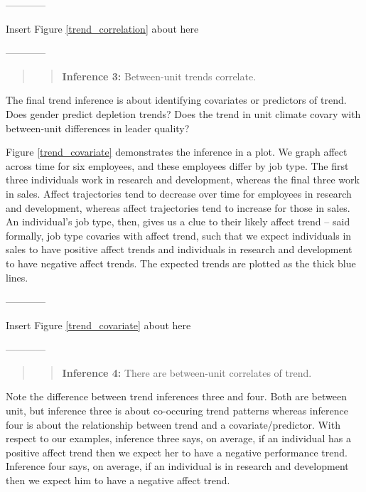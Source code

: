 \documentclass[english,,man]{apa6}
\begin{document}
\begin{center}

------------

Insert Figure \ref{trend_correlation} about here

------------

\end{center}

\begin{quote}
\begin{quote}
\textbf{Inference 3:} Between-unit trends correlate.
\end{quote}
\end{quote}

The final trend inference is about identifying covariates or predictors of trend. Does gender predict depletion trends? Does the trend in unit climate covary with between-unit differences in leader quality?

Figure \ref{trend_covariate} demonstrates the inference in a plot. We graph affect across time for six employees, and these employees differ by job type. The first three individuals work in research and development, whereas the final three work in sales. Affect trajectories tend to decrease over time for employees in research and development, whereas affect trajectories tend to increase for those in sales. An individual's job type, then, gives us a clue to their likely affect trend -- said formally, job type covaries with affect trend, such that we expect individuals in sales to have positive affect trends and individuals in research and development to have negative affect trends. The expected trends are plotted as the thick blue lines.

\begin{center}

------------

Insert Figure \ref{trend_covariate} about here

------------

\end{center}

\begin{quote}
\begin{quote}
\textbf{Inference 4:} There are between-unit correlates of trend.
\end{quote}
\end{quote}

Note the difference between trend inferences three and four. Both are between unit, but inference three is about co-occuring trend patterns whereas inference four is about the relationship between trend and a covariate/predictor. With respect to our examples, inference three says, on average, if an individual has a positive affect trend then we expect her to have a negative performance trend. Inference four says, on average, if an individual is in research and development then we expect him to have a negative affect trend.
\end{document}
